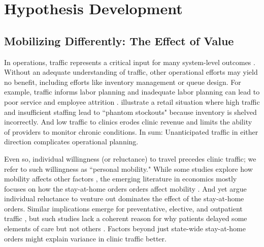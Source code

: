 \section{Hypothesis Development} \label{VC2_HD}
\subsection{Mobilizing Differently: The Effect of Value}
 In operations, traffic represents a critical input for many system-level outcomes \citep[e.g.,][]{Perdikaki2012}. Without an adequate understanding of traffic, other operational efforts may yield no benefit, including efforts like inventory management or queue design. For example, traffic informs labor planning \citep[e.g.,][]{Chuang2015} and inadequate labor planning can lead to poor service and employee attrition \citep{Ton2008}. \cite{Lee2017} illustrate a retail situation where high traffic and insufficient staffing lead to “phantom stockouts" because inventory is shelved incorrectly. And low traffic to clinics \cite[such as documented by][]{Mehrotra2020,Mehrotra2021} erodes clinic revenue and limits the ability of providers to monitor chronic conditions. In sum: Unanticipated traffic in either direction complicates operational planning.
 
 Even so, individual willingness (or reluctance) to travel precedes clinic traffic; we refer to such willingness as “personal mobility." While some studies explore how mobility affects other factors \citep[e.g., the spread of infection in][]{Dave2020}, the emerging literature in economics mostly focuses on how the stay-at-home orders orders affect mobility \citep[review in][]{Gupta2020}. And yet \cite{Goolsbee2020_key} argue individual reluctance to venture out dominates the effect of the stay-at-home orders. Similar implications emerge for preventative, elective, and outpatient traffic \citep{Ziedan2020,Cantor2020}, but such studies lack a coherent reason for why patients delayed some elements of care but not others \citep{Czeisler2020}. Factors beyond just state-wide stay-at-home orders might explain variance in clinic traffic better.
 
